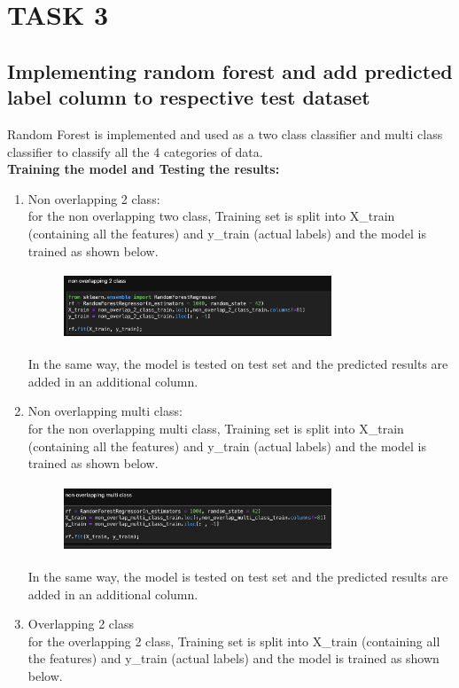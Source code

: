 \documentclass[conference]{IEEEtran}
\begin{document}
\section{TASK 3 }
\subsection{Implementing random forest and add predicted label column to respective test dataset}
Random Forest is implemented and used as a two class classifier and multi class classifier to classify all the 4 categories of data. \\
\textbf{Training the model and Testing the results:}\\
\begin{enumerate}
\item
Non overlapping 2 class: \\
for the non overlapping two class, Training set is split into X\_train (containing all the features) and y\_train (actual labels) and the model is trained as shown below.
\begin{figure}[!htbp]
    \centering
    \includegraphics[width=8cm, height=2cm]{task2.17.png}
    \label{fig:my_label}
\end{figure}
In the same way, the model is tested on test set and the predicted results are added in an additional column.
\item
Non overlapping multi class: \\
for the non overlapping multi class, Training set is split into X\_train (containing all the features) and y\_train (actual labels) and the model is trained as shown below.
\begin{figure}[!htbp]
    \centering
    \includegraphics[width=8cm, height=2cm]{task2.18.png}
    \label{fig:my_label}
\end{figure}
In the same way, the model is tested on test set and the predicted results are added in an additional column.
\item
Overlapping 2 class \\
for the overlapping 2 class, Training set is split into X\_train (containing all the features) and y\_train (actual labels) and the model is trained as shown below.

\end{enumerate}
\end{document}

